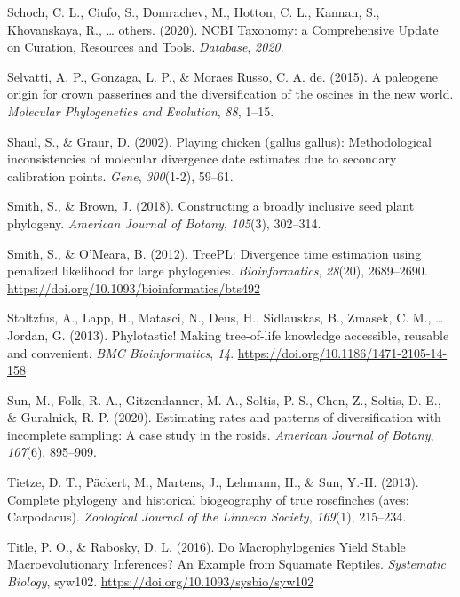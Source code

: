 \documentclass[english,man]{apa6}
\begin{document}
\leavevmode\hypertarget{ref-schoch2020ncbi}{}%
Schoch, C. L., Ciufo, S., Domrachev, M., Hotton, C. L., Kannan, S., Khovanskaya, R., \ldots{} others. (2020). NCBI Taxonomy: a Comprehensive Update on Curation, Resources and Tools. \emph{Database}, \emph{2020}.

\leavevmode\hypertarget{ref-selvatti2015paleogene}{}%
Selvatti, A. P., Gonzaga, L. P., \& Moraes Russo, C. A. de. (2015). A paleogene origin for crown passerines and the diversification of the oscines in the new world. \emph{Molecular Phylogenetics and Evolution}, \emph{88}, 1--15.

\leavevmode\hypertarget{ref-shaul2002playing}{}%
Shaul, S., \& Graur, D. (2002). Playing chicken (gallus gallus): Methodological inconsistencies of molecular divergence date estimates due to secondary calibration points. \emph{Gene}, \emph{300}(1-2), 59--61.

\leavevmode\hypertarget{ref-smith2018constructing}{}%
Smith, S., \& Brown, J. (2018). Constructing a broadly inclusive seed plant phylogeny. \emph{American Journal of Botany}, \emph{105}(3), 302--314.

\leavevmode\hypertarget{ref-Smith2012}{}%
Smith, S., \& O'Meara, B. (2012). TreePL: Divergence time estimation using penalized likelihood for large phylogenies. \emph{Bioinformatics}, \emph{28}(20), 2689--2690. \url{https://doi.org/10.1093/bioinformatics/bts492}

\leavevmode\hypertarget{ref-Stoltzfus2013}{}%
Stoltzfus, A., Lapp, H., Matasci, N., Deus, H., Sidlauskas, B., Zmasek, C. M., \ldots{} Jordan, G. (2013). Phylotastic! Making tree-of-life knowledge accessible, reusable and convenient. \emph{BMC Bioinformatics}, \emph{14}. \url{https://doi.org/10.1186/1471-2105-14-158}

\leavevmode\hypertarget{ref-sun2020estimating}{}%
Sun, M., Folk, R. A., Gitzendanner, M. A., Soltis, P. S., Chen, Z., Soltis, D. E., \& Guralnick, R. P. (2020). Estimating rates and patterns of diversification with incomplete sampling: A case study in the rosids. \emph{American Journal of Botany}, \emph{107}(6), 895--909.

\leavevmode\hypertarget{ref-tietze2013complete}{}%
Tietze, D. T., Päckert, M., Martens, J., Lehmann, H., \& Sun, Y.-H. (2013). Complete phylogeny and historical biogeography of true rosefinches (aves: Carpodacus). \emph{Zoological Journal of the Linnean Society}, \emph{169}(1), 215--234.

\leavevmode\hypertarget{ref-title2016macrophylogenies}{}%
Title, P. O., \& Rabosky, D. L. (2016). Do Macrophylogenies Yield Stable Macroevolutionary Inferences? An Example from Squamate Reptiles. \emph{Systematic Biology}, syw102. \url{https://doi.org/10.1093/sysbio/syw102}
\end{document}
